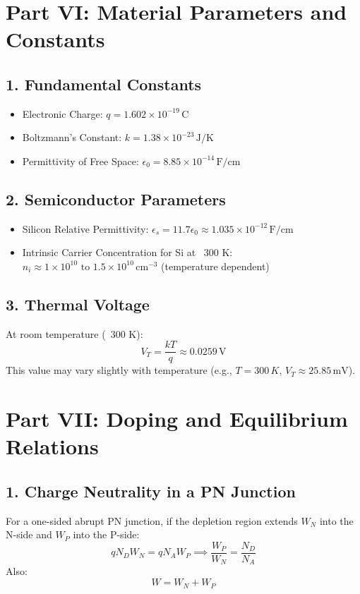 \documentclass[12pt]{article}
\begin{document}
\section{Part VI: Material Parameters and Constants}

\subsection{1. Fundamental Constants}
\begin{itemize}
    \item Electronic Charge: \( q = 1.602 \times 10^{-19}\, \text{C} \)
    \item Boltzmann’s Constant: \( k = 1.38 \times 10^{-23}\, \text{J/K} \)
    \item Permittivity of Free Space: \( \epsilon_0 = 8.85 \times 10^{-14}\, \text{F/cm} \)
\end{itemize}

\subsection{2. Semiconductor Parameters}
\begin{itemize}
    \item Silicon Relative Permittivity: \( \epsilon_s = 11.7\epsilon_0 \approx 1.035 \times 10^{-12}\, \text{F/cm} \)
    \item Intrinsic Carrier Concentration for Si at ~300 K: \( n_i \approx 1 \times 10^{10} \text{ to } 1.5 \times 10^{10}\, \text{cm}^{-3} \) (temperature dependent)
\end{itemize}

\subsection{3. Thermal Voltage}
At room temperature (~300 K):
\[
V_T = \frac{kT}{q} \approx 0.0259\, \text{V}
\]
This value may vary slightly with temperature (e.g., \( T = 300\,K \), \( V_T \approx 25.85\, \text{mV} \)).

\section{Part VII: Doping and Equilibrium Relations}

\subsection{1. Charge Neutrality in a PN Junction}
For a one-sided abrupt PN junction, if the depletion region extends \( W_N \) into the N-side and \( W_P \) into the P-side:
\[
q N_D W_N = q N_A W_P \implies \frac{W_P}{W_N} = \frac{N_D}{N_A}
\]
Also:
\[
W = W_N + W_P
\]
\end{document}
